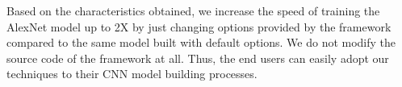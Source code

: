 Based on the characteristics obtained, we increase the speed of training the AlexNet model up to 2X by just changing options provided by the framework compared to the same model built with default options. We do not modify the source code of the framework at all. Thus, the end users can easily adopt our techniques to their CNN model building processes.



